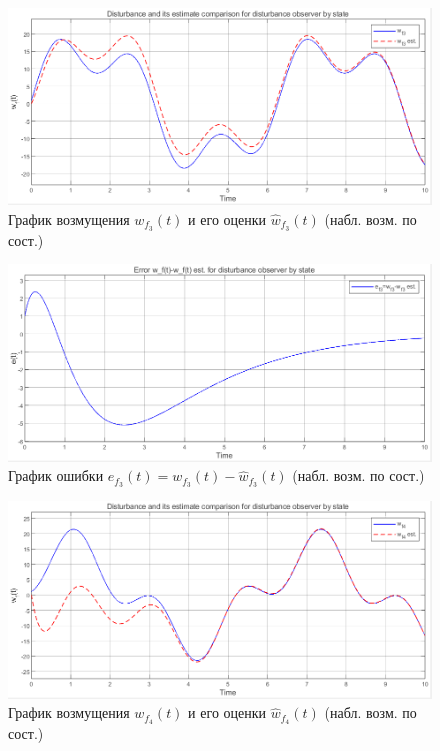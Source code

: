 \documentclass[a4paper, 12pt]{article}
\begin{document}
    \begin{figure}[H]
        \centering
        \includegraphics[scale=0.6]{3task_wfhwf3.png}
        \captionsetup{skip=0pt}
        \caption{График возмущения $w_{f_3}(t)$ и его оценки $\hat{w}_{f_3}(t)$ (набл. возм. по сост.)}
        \label{fig:3task_wfhwf3}
    \end{figure}
    \begin{figure}[H]
        \centering
        \includegraphics[scale=0.6]{3task_ef3.png}
        \captionsetup{skip=0pt}
        \caption{График ошибки $e_{f_3}(t)=w_{f_3}(t)-\hat{w}_{f_3}(t)$ (набл. возм. по сост.)}
        \label{fig:3task_ef3}
    \end{figure}
    \begin{figure}[H]
        \centering
        \includegraphics[scale=0.6]{3task_wfhwf4.png}
        \captionsetup{skip=0pt}
        \caption{График возмущения $w_{f_4}(t)$ и его оценки $\hat{w}_{f_4}(t)$ (набл. возм. по сост.)}
        \label{fig:3task_wfhwf4}
    \end{figure}
\end{document}
